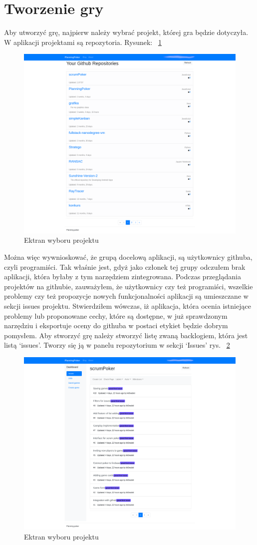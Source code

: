\section{Tworzenie gry}
Aby utworzyć grę, najpierw należy wybrać projekt, której gra będzie dotyczyła.
W aplikacji projektami są repozytoria. Rysunek: 
~\ref{rys:projekty}
\begin{figure}
	\centering\includegraphics[width=.7\textwidth]{img/repositories}
	\caption{Ektran wyboru projektu}\label{rys:projekty}%
\end{figure}
Można więc wywnioskować, że grupą docelową aplikacji, są użytkownicy githuba, czyli programiści.
Tak właśnie jest, gdyż jako członek tej grupy odczułem brak aplikacji, która byłaby z tym narzędziem zintegrowana.
Podczas przeglądania projektów na githubie, zauważyłem, że użytkownicy czy też programiści,
wszelkie problemy czy też propozycje nowych funkcjonalności aplikacji są umieszczane w sekcji issues projektu.
Stwierdziłem wówczas, iż aplikacja, która ocenia istniejące problemy lub proponowane cechy, które są dostępne,
w już sprawdzonym narzędziu i eksportuje oceny do githuba w postaci etykiet będzie dobrym pomysłem.
Aby stworzyć grę należy stworzyć listę zwaną backlogiem, która jest listą `issues'.
Tworzy się ją w panelu repozytorium w sekcji `Issues' rys.
~\ref{rys:issues} 
\begin{figure}
	\centering\includegraphics[width=.7\textwidth]{img/issues}
	\caption{Ektran wyboru projektu}\label{rys:issues}%
\end{figure}
